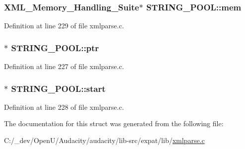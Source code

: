 \subsubsection[{\texorpdfstring{mem}{mem}}]{ {\bf X\+M\+L\+\_\+\+Memory\+\_\+\+Handling\+\_\+\+Suite}$\ast$ S\+T\+R\+I\+N\+G\+\_\+\+P\+O\+O\+L\+::mem}\hypertarget{struct_s_t_r_i_n_g___p_o_o_l_aae511e75e1be26340f854a07a2dc928a}{}\label{struct_s_t_r_i_n_g___p_o_o_l_aae511e75e1be26340f854a07a2dc928a}


Definition at line 229 of file xmlparse.\+c.

\subsubsection[{\texorpdfstring{ptr}{ptr}}]{$\ast$ S\+T\+R\+I\+N\+G\+\_\+\+P\+O\+O\+L\+::ptr}\hypertarget{struct_s_t_r_i_n_g___p_o_o_l_a975adff9721f6fb66e590c1b8edeb87b}{}\label{struct_s_t_r_i_n_g___p_o_o_l_a975adff9721f6fb66e590c1b8edeb87b}


Definition at line 227 of file xmlparse.\+c.

\subsubsection[{\texorpdfstring{start}{start}}]{$\ast$ S\+T\+R\+I\+N\+G\+\_\+\+P\+O\+O\+L\+::start}\hypertarget{struct_s_t_r_i_n_g___p_o_o_l_aa62e883e0c4361ea3ce1c44eaa4aeea4}{}\label{struct_s_t_r_i_n_g___p_o_o_l_aa62e883e0c4361ea3ce1c44eaa4aeea4}


Definition at line 228 of file xmlparse.\+c.



The documentation for this struct was generated from the following file\+:\begin{DoxyCompactItemize}
\item 
C\+:/\+\_\+dev/\+Open\+U/\+Audacity/audacity/lib-\/src/expat/lib/\hyperlink{xmlparse_8c}{xmlparse.\+c}\end{DoxyCompactItemize}
